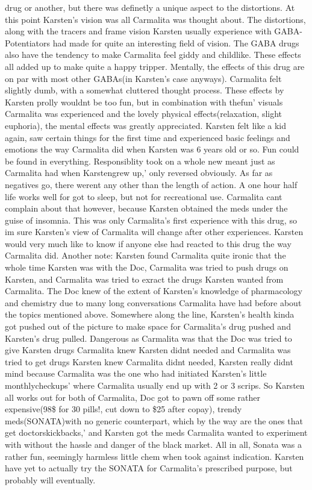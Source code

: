 \documentclass[12pt]{book}
\begin{document}
drug or another, but there was definetly a unique aspect to the distortions. At this point Karsten's vision was all Carmalita was thought about. The distortions, along with the tracers and frame vision Karsten usually experience with GABA-Potentiators had made for quite an interesting field of vision. The GABA drugs also have the tendency to make Carmalita feel giddy and childlike. These effects all added up to make quite a happy tripper. Mentally, the effects of this drug are on par with most other GABAs(in Karsten's case anyways). Carmalita felt slightly dumb, with a somewhat cluttered thought process. These effects by Karsten prolly wouldnt be too fun, but in combination with thefun' visuals Carmalita was experienced and the lovely physical effects(relaxation, slight euphoria), the mental effects was greatly appreciated. Karsten felt like a kid again, saw certain things for the first time and experienced basic feelings and emotions the way Carmalita did when Karsten was 6 years old or so. Fun could be found in everything. Responsiblity took on a whole new meant just as Carmalita had when Karstengrew up,' only reversed obviously. As far as negatives go, there werent any other than the length of action. A one hour half life works well for got to sleep, but not for recreational use. Carmalita cant complain about that however, because Karsten obtained the meds under the guise of insomnia. This was only Carmalita's first experience with this drug, so im sure Karsten's view of Carmalita will change after other experiences. Karsten would very much like to know if anyone else had reacted to this drug the way Carmalita did. Another note: Karsten found Carmalita quite ironic that the whole time Karsten was with the Doc, Carmalita was tried to push drugs on Karsten, and Carmalita was tried to exract the drugs Karsten wanted from Carmalita. The Doc knew of the extent of Karsten's knowledge of pharmacology and chemistry due to many long conversations Carmalita have had before about the topics mentioned above. Somewhere along the line, Karsten's health kinda got pushed out of the picture to make space for Carmalita's drug pushed and Karsten's drug pulled. Dangerous as Carmalita was that the Doc was tried to give Karsten drugs Carmalita knew Karsten didnt needed and Carmalita was tried to get drugs Karsten knew Carmalita didnt needed, Karsten really didnt mind because Carmalita was the one who had initiated Karsten's little monthlycheckups' where Carmalita usually end up with 2 or 3 scrips. So Karsten all works out for both of Carmalita, Doc got to pawn off some rather expensive(98\$ for 30 pills!, cut down to \$25 after copay), trendy meds(SONATA)with no generic counterpart, which by the way are the ones that get doctorskickbacks,' and Karsten got the meds Carmalita wanted to experiment with without the hassle and danger of the black market. All in all, Sonata was a rather fun, seemingly harmless little chem when took against indication. Karsten have yet to actually try the SONATA for Carmalita's prescribed purpose, but probably will eventually.
\end{document}

